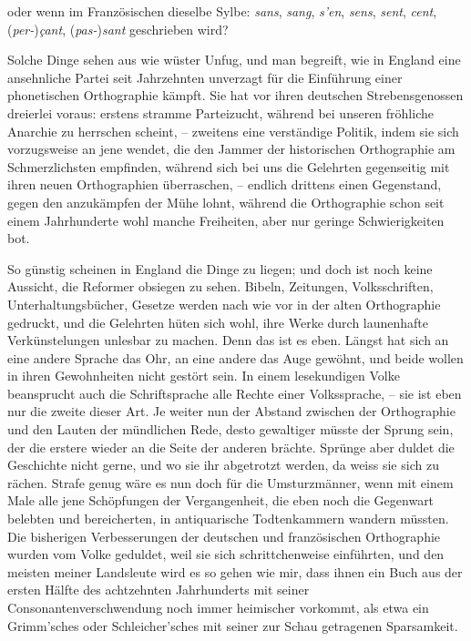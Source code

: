 \begin{sloppypar}\noindent oder wenn im Französischen dieselbe Sylbe: \textit{sans}, \textit{sang}, \textit{s’en}, \textit{sens}, \textit{sent}, \textit{cent}, \mbox{(\textit{per-})\textit{çant}}, \mbox{(\textit{pas-})\textit{sant}} geschrieben wird?\end{sloppypar}

Solche Dinge sehen aus wie wüster Unfug, und man begreift, wie in England eine ansehnliche Partei seit Jahrzehnten unverzagt für die Einführung einer \label{sp.133} phonetischen Orthographie kämpft. Sie hat vor ihren deutschen Strebensgenossen dreierlei voraus: erstens stramme Parteizucht, während bei unseren  fröhliche Anarchie zu herrschen scheint, – zweitens eine verständige Politik, indem sie sich vorzugsweise an jene wendet, die den Jammer der historischen Orthographie am \label{fp.142} Schmerzlichsten empfinden, während sich bei uns die Gelehrten gegenseitig mit ihren neuen Orthographien überraschen, – endlich drittens einen Gegenstand, gegen den anzukämpfen der Mühe lohnt, während die  Orthographie schon seit einem Jahrhunderte wohl manche Freiheiten, aber nur geringe Schwierigkeiten bot.

So günstig scheinen in England die Dinge zu liegen; und doch ist noch keine Aussicht, die Reformer obsiegen zu sehen. Bibeln, Zeitungen, Volksschriften, Unterhaltungsbücher, Gesetze werden nach wie vor in der alten Orthographie gedruckt, und die Gelehrten hüten sich wohl, ihre Werke durch launenhafte Verkünstelungen unlesbar zu machen. Denn das ist es eben. Längst hat sich an eine andere Sprache das Ohr, an eine andere das Auge gewöhnt, und beide wollen in ihren Gewohnheiten nicht gestört sein. In einem lesekundigen Volke beansprucht auch die Schriftsprache alle Rechte einer Volkssprache, – sie ist eben nur die zweite dieser Art. Je weiter nun der Abstand zwischen der Orthographie und den Lauten der mündlichen Rede, desto gewaltiger müsste der Sprung sein, der die erstere wieder an die Seite der anderen brächte. Sprünge aber duldet die Geschichte nicht gerne, und wo sie ihr abgetrotzt werden, da weiss sie sich zu rächen. Strafe genug wäre es nun doch für die Umsturzmänner, wenn mit einem Male alle jene Schöpfungen der Vergangenheit, die eben noch die Gegenwart belebten und bereicherten, in antiquarische Todtenkammern wandern müssten. Die bisherigen Verbesserungen der deutschen und französischen Orthographie wurden vom Volke geduldet, weil sie sich schrittchenweise einführten, und den meisten meiner Landsleute wird es so gehen wie mir, dass ihnen ein  Buch aus der ersten Hälfte des achtzehnten Jahrhunderts mit seiner Consonantenverschwendung noch immer heimischer vorkommt, als etwa ein Grimm’sches oder Schleicher’sches mit seiner zur Schau getragenen Sparsamkeit.

